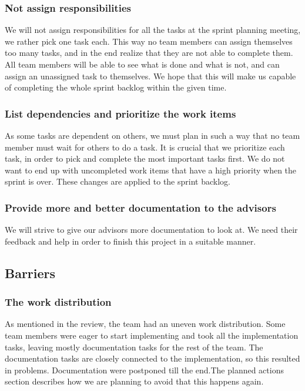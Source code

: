 {{\subsubsection{Not assign responsibilities}
We will not assign responsibilities for all the tasks at the sprint planning meeting, we rather pick one task each. This way no team members can assign themselves too many tasks, and in the end realize that they are not able to complete them. All team members will be able to see what is done and what is not, and can assign an unassigned task to themselves. We hope that this will make us capable of completing the whole sprint backlog within the given time.

\subsubsection{List dependencies and prioritize the work items}
As some tasks are dependent on others, we must plan in such a way that no team member must wait for others to do a task. It is crucial that we prioritize each task, in order to pick and complete the most important tasks first. We do not want to end up with uncompleted work items that have a high priority when the sprint is over. These changes are applied to the sprint backlog.

\subsubsection{Provide more and better documentation to the advisors}
We will strive to give our advisors more documentation to look at. We need their feedback and help in order to finish this project in a suitable manner. 


\subsection{Barriers}
\subsubsection{The work distribution} 
As mentioned in the review, the team had an uneven work distribution. Some team members were eager to start implementing and took all the implementation tasks, leaving mostly documentation tasks for the rest of the team. The documentation tasks are closely connected to the implementation, so this resulted in problems. Documentation were postponed till the end.The planned actions section describes how we are planning to avoid that this happens again. 

}}

